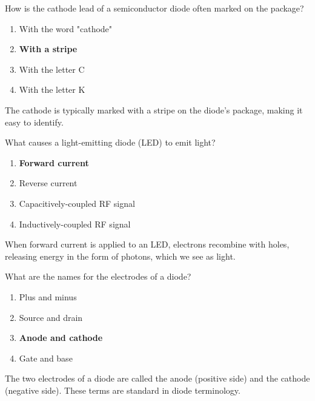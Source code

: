 \begin{tcolorbox}[colback=gray!10!white,colframe=black!75!black,title={T6B06}]
    How is the cathode lead of a semiconductor diode often marked on the package?
    \begin{enumerate}[label=\Alph*),noitemsep]
        \item With the word "cathode"
        \item \textbf{With a stripe}
        \item With the letter C
        \item With the letter K
    \end{enumerate}
\end{tcolorbox}
The cathode is typically marked with a stripe on the diode's package, making it easy to identify.

\begin{tcolorbox}[colback=gray!10!white,colframe=black!75!black,title={T6B07}]
    What causes a light-emitting diode (LED) to emit light?
    \begin{enumerate}[label=\Alph*),noitemsep]
        \item \textbf{Forward current}
        \item Reverse current
        \item Capacitively-coupled RF signal
        \item Inductively-coupled RF signal
    \end{enumerate}
\end{tcolorbox}
When forward current is applied to an LED, electrons recombine with holes, releasing energy in the form of photons, which we see as light.

\begin{tcolorbox}[colback=gray!10!white,colframe=black!75!black,title={T6B09}]
    What are the names for the electrodes of a diode?
    \begin{enumerate}[label=\Alph*),noitemsep]
        \item Plus and minus
        \item Source and drain
        \item \textbf{Anode and cathode}
        \item Gate and base
    \end{enumerate}
\end{tcolorbox}
The two electrodes of a diode are called the anode (positive side) and the cathode (negative side). These terms are standard in diode terminology.
